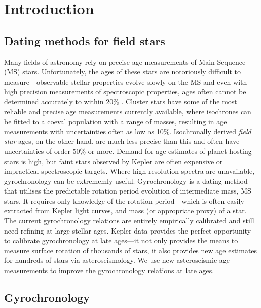 \documentclass[10pt,preprint]{aastex}
\begin{document}
\section{Introduction}
\label{intro}
\subsection{Dating methods for field stars}

Many fields of astronomy rely on precise age measurements of Main Sequence (MS) stars.
Unfortunately, the ages of these stars are notoriously difficult to measure---observable stellar properties evolve slowly on the MS and even with high precision measurements of spectroscopic properties, ages often cannot be determined accurately to within 20\% \citep{Soderblom2010}.
Cluster stars have some of the most reliable and precise age measurements currently available, where isochrones can be fitted to a coeval population with a range of masses, resulting in age measurements with uncertainties often as low as 10\%.
Isochronally derived {\it field star} ages, on the other hand, are much less precise than this and often have uncertainties of order 50\% or more.
Demand for age estimates of planet-hosting stars is high, but faint stars observed by Kepler are often expensive or impractical spectroscopic targets.
Where high resolution spectra are unavailable, gyrochronology can be extrememly useful.
Gyrochronology is a dating method that utilises the predictable rotation period evolution of intermediate mass, MS stars.
It requires only knowledge of the rotation period---which is often easily extracted from Kepler light curves, and mass (or appropriate proxy) of a star.
The current gyrochronology relations are entirely empirically calibrated and still need refining at large stellar ages.
Kepler data provides the perfect opportunity to calibrate gyrochronology at late ages---it not only provides the means to measure surface rotation of thousands of stars, it also provides new age estimates for hundreds of stars via asteroseismology.
We use new asteroseismic age measurements to improve the gyrochronology relations at late ages.

\subsection{Gyrochronology}
\end{document}
